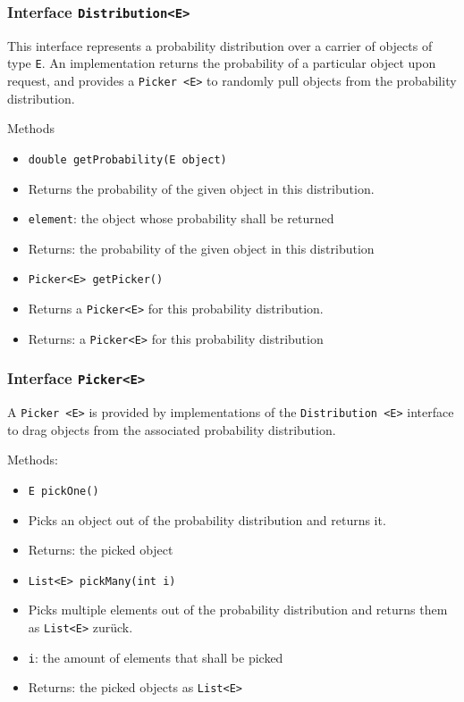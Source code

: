 \documentclass[parskip=full,11pt]{scrartcl}
\begin{document}
\subsubsection{Interface \texttt{Distribution<E>}}
This interface represents a probability distribution over a carrier of objects of type \texttt{E}. An implementation returns the probability of a particular object upon request, and provides a \texttt{Picker <E>} to randomly pull objects from the probability distribution.

Methods
\begin{itemize}\itemsep -10pt
\item \texttt{double getProbability(E object)}
\item[] Returns the probability of the given object in this distribution.
\item[] \texttt{element}: the object whose probability shall be returned
\item[] Returns: the probability of the given object in this distribution

\item \texttt{Picker<E> getPicker()}
\item[] Returns a \texttt{Picker<E>} for this probability distribution.
\item[] Returns: a \texttt{Picker<E>} for this probability distribution
\end{itemize}

\subsubsection{Interface \texttt{Picker<E>}}
A \texttt{Picker <E>} is provided by implementations of the \texttt{Distribution <E>} interface to drag objects from the associated probability distribution.

Methods:
\begin{itemize}\itemsep -10pt
\item \texttt{E pickOne()}
\item[] Picks an object out of the probability distribution and returns it.
\item[] Returns: the picked object

\item \texttt{List<E> pickMany(int i)}
\item[] Picks multiple elements out of the probability distribution and returns them as \texttt{List<E>} zurück.
\item[] \texttt{i}: the amount of elements that shall be picked
\item[] Returns: the picked objects as \texttt{List<E>}
\end{itemize}
\end{document}

